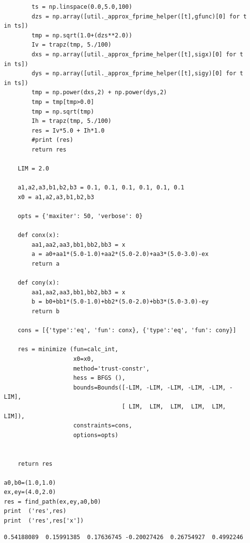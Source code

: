 \documentclass[12pt,fleqn]{article}\usepackage{../../common}
\begin{document}
\begin{verbatim}
        ts = np.linspace(0.0,5.0,100)
        dzs = np.array([util._approx_fprime_helper([t],gfunc)[0] for t in ts])
        tmp = np.sqrt(1.0+(dzs**2.0))
        Iv = trapz(tmp, 5./100)
        dxs = np.array([util._approx_fprime_helper([t],sigx)[0] for t in ts])
        dys = np.array([util._approx_fprime_helper([t],sigy)[0] for t in ts])
        tmp = np.power(dxs,2) + np.power(dys,2)
        tmp = tmp[tmp>0.0]
        tmp = np.sqrt(tmp)
        Ih = trapz(tmp, 5./100)
        res = Iv*5.0 + Ih*1.0
        #print (res)
        return res 
    
    LIM = 2.0

    a1,a2,a3,b1,b2,b3 = 0.1, 0.1, 0.1, 0.1, 0.1, 0.1
    x0 = a1,a2,a3,b1,b2,b3

    opts = {'maxiter': 50, 'verbose': 0}
    
    def conx(x):
        aa1,aa2,aa3,bb1,bb2,bb3 = x
        a = a0+aa1*(5.0-1.0)+aa2*(5.0-2.0)+aa3*(5.0-3.0)-ex
        return a
    
    def cony(x):
        aa1,aa2,aa3,bb1,bb2,bb3 = x
        b = b0+bb1*(5.0-1.0)+bb2*(5.0-2.0)+bb3*(5.0-3.0)-ey
        return b
    
    cons = [{'type':'eq', 'fun': conx}, {'type':'eq', 'fun': cony}]
    
    res = minimize (fun=calc_int,
                    x0=x0,
                    method='trust-constr',
                    hess = BFGS (),
                    bounds=Bounds([-LIM, -LIM, -LIM, -LIM, -LIM, -LIM],
                                  [ LIM,  LIM,  LIM,  LIM,  LIM,  LIM]),
                    constraints=cons,
                    options=opts)
    

    return res

a0,b0=(1.0,1.0)
ex,ey=(4.0,2.0)
res = find_path(ex,ey,a0,b0)
print  ('res',res)
print  ('res',res['x'])
\end{verbatim}

\begin{verbatim}
0.54188089  0.15991385  0.17636745 -0.20027426  0.26754927  0.4992246 
\end{verbatim}
\end{document}

